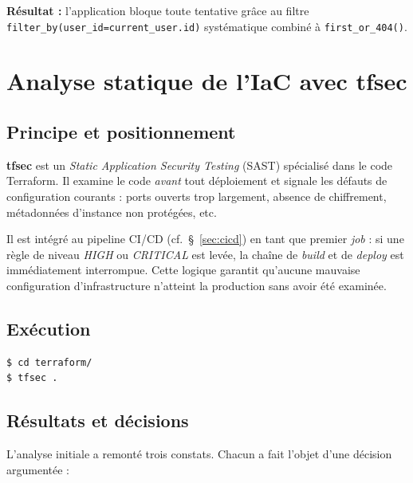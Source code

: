 \textbf{Résultat :} l'application bloque toute tentative grâce au
filtre \texttt{filter\_by(user\_id=current\_user.id)} systématique
combiné à \texttt{first\_or\_404()}.

\section{Analyse statique de l'IaC avec tfsec}

\subsection{Principe et positionnement}

\textbf{tfsec} est un \textit{Static Application Security Testing}
(SAST) spécialisé dans le code Terraform. Il examine le code
\emph{avant} tout déploiement et signale les défauts de configuration
courants : ports ouverts trop largement, absence de chiffrement,
métadonnées d'instance non protégées, etc.

Il est intégré au pipeline CI/CD (cf.~\S~\ref{sec:cicd}) en tant que
premier \emph{job} : si une règle de niveau \emph{HIGH} ou
\emph{CRITICAL} est levée, la chaîne de \emph{build} et de
\emph{deploy} est immédiatement interrompue. Cette logique garantit
qu'aucune mauvaise configuration d'infrastructure n'atteint la
production sans avoir été examinée.

\subsection{Exécution}

\begin{lstlisting}[language=bash, caption={Exécution locale de tfsec.}]
$ cd terraform/
$ tfsec .
\end{lstlisting}

\subsection{Résultats et décisions}

L'analyse initiale a remonté trois constats. Chacun a fait l'objet
d'une décision argumentée :

